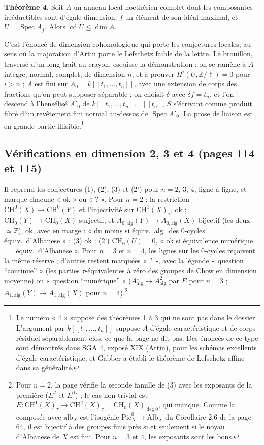 \documentclass[11pt,a4paper]{article}
\begin{document}
\textbf{Théorème 4.} Soit $A$ un anneau local noethérien complet dont les
composantes irréductibles sont d'égale dimension, $f$ un élément de son idéal
maximal, et $U = \operatorname{Spec} A_{f}$. Alors $\operatorname{cd} U
\leqslant \dim A$.

C'est l'énoncé de dimension cohomologique qui porte les conjectures locales, au
sens où la majoration d'Artin porte le Lefschetz faible de la lettre. Le
brouillon, traversé d'un long trait au crayon, esquisse la démonstration : on se
ramène à $A$ intègre, normal, complet, de dimension $n$, et à prouver
$H^{i}(U, \mathbb{Z}/\ell) = 0$ pour $i > n$ ; $A$ est fini sur $A_{0} =
k[[t_{1}, \ldots, t_{n}]]$, avec une extension de corps des fractions qu'on
peut supposer séparable ; on choisit $\delta$ avec $\delta f = t_{n}$, et l'on
descend à l'hensélisé $A'_{0}$ de $k[[t_{1}, \ldots, t_{n-1}]][t_{n}]$, $S$
s'écrivant comme produit fibré d'un revêtement fini normal au-dessus de
$\operatorname{Spec} A'_{0}$. La prose de liaison est en grande partie
illisible.\footnote{Le numéro « 4 » suppose des théorèmes 1 à 3 qui ne sont pas
dans le dossier. L'argument par $k[[t_{1}, \ldots, t_{n}]]$ suppose $A$ d'égale
caractéristique et de corps résiduel séparablement clos, ce que la page ne dit
pas. Des énoncés de ce type sont démontrés dans SGA 4, exposé XIX (Artin), pour
les schémas excellents d'égale caractéristique, et Gabber a établi le théorème
de Lefschetz affine dans sa généralité.}

\subsection*{Vérifications en dimension 2, 3 et 4 (pages 114 et 115)}

Il reprend les conjectures (1), (2), (3) et (2') pour $n = 2$, $3$, $4$, ligne à
ligne, et marque chacune « ok » ou « ? ». Pour $n = 2$ : la restriction
$\mathrm{CH}^{0}(X) \to \mathrm{CH}^{0}(Y)$ et l'injectivité sur
$\mathrm{CH}^{1}(X)_{\tau}$, ok ; $\mathrm{CH}_{0}(Y) \to \mathrm{CH}_{0}(X)$
surjectif, et $A_{0,\mathrm{alg}}(Y) \to A_{0,\mathrm{alg}}(X)$ bijectif (les
deux $\simeq \mathbb{Z}$), ok, avec en marge : « du moins si équiv.\ alg.\ des $0$-cycles $=$ équiv.\ d'Albanese » ; (3) ok ; (2') $\mathrm{CH}_{0}(U) = 0$,
« ok si équivalence numérique $=$ équiv.\ d'Albanese ». Pour $n = 3$ et $n = 4$,
les lignes sur les $0$-cycles reçoivent la même réserve ; d'autres restent
marquées « ? », avec la légende « question “continue” » (les parties
$\tau$-équivalentes à zéro des groupes de Chow en dimension moyenne) ou
« question “numérique” » ($A^{1}_{\mathrm{alg}} \to A^{2}_{\mathrm{alg}}$ par
$E$ pour $n = 3$ ; $A_{1,\mathrm{alg}}(Y) \to A_{1,\mathrm{alg}}(X)$ pour $n =
4$).\footnote{Pour $n = 2$, la page vérifie la seconde famille de (3) avec les
exposants de la première ($E^{2}$ et $E^{0}$) ; le cas non trivial est $E \colon
\mathrm{CH}^{1}(X)_{\tau} \to \mathrm{CH}^{2}(X)_{\tau} =
\mathrm{CH}_{0}(X)_{\deg 0}$, qui manque. Comme la composée avec
$\mathrm{alb}_{X}$ est l'isogénie $\mathrm{Pic}^{0}_{X} \to \mathrm{Alb}_{X}$ du
Corollaire 2.6 de la page 64, il est bijectif à des groupes finis près si et
seulement si le noyau d'Albanese de $X$ est fini. Pour $n = 3$ et $4$, les
exposants sont les bons.}
\end{document}
